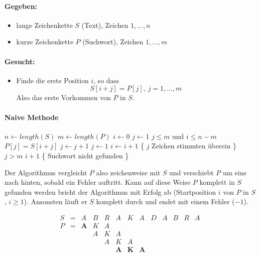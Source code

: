 \documentclass[a4paper]{scrartcl}
\begin{document}
\paragraph{Gegeben:}
\begin{itemize}
	\item lange Zeichenkette $S$ (Text), Zeichen $1,\ldots,n$
	\item kurze Zeichenkette $P$ (Suchwort), Zeichen $1,\ldots,m$
\end{itemize}
\paragraph{Gesucht:}
\begin{itemize}
	\item Finde die erste Position $i$, so dass
		$$S[i+j] = P[j],\ j=1,\ldots,m$$
		Also das erste Vorkommen von $P$ in $S$.
\end{itemize}

\paragraph{Naive Methode}

\begin{codebox}
\li $n \gets length(S)$
\li $m \gets length(P)$
\li $i \gets 0$
\li	$j \gets 1$
\li	\While $j \leq m$ und $i \leq n-m$
\li	\Do \If $P[j]=S[i+j]$
\li			\Then $j \gets j+1$
\li			\Else $j \gets 1$
\li						$i \gets i + 1$
				\End
		\End
\zi \{ $j$ Zeichen stimmten überein \}
\li	\If $j > m$
\li			\Then \Return $i + 1$
		\End
\zi \{ Suchwort nicht gefunden \}
\li	{}
\end{codebox}

Der Algorithmus vergleicht $P$ also zeichenweise mit $S$ und verschiebt $P$ um eins nach hinten, sobald ein Fehler auftritt.
Kann auf diese Weise $P$ komplett in $S$ gefunden werden bricht der Algorithmus mit Erfolg ab (Startposition $i$ von $P$ in $S$,
$i \geq 1$). Ansonsten läuft er $S$ komplett durch und endet mit einem Fehler ($-1$).

$$\begin{array}{ccccccccccccc}
	S & = & A & B & R & A & K & A & D & A & B & R & A \\
  P & = & \textbf{A} & K & A \\
	  &   &   & A & K & A \\
	  &   &	  &   & A & K & A \\
	  &	  &   &	  &   & \textbf{A} & \textbf{K} & \textbf{A} \\
\end{array}$$
\end{document}
